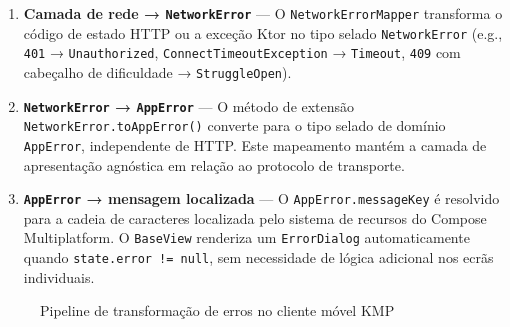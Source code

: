 \begin{enumerate}
  \item \textbf{Camada de rede → \texttt{NetworkError}} —
    O \texttt{NetworkErrorMapper} transforma o código de estado HTTP ou a
    exceção Ktor no tipo selado \texttt{NetworkError}
    (e.g., \texttt{401} → \texttt{Unauthorized},
    \texttt{ConnectTimeoutException} → \texttt{Timeout},
    \texttt{409} com cabeçalho de dificuldade → \texttt{StruggleOpen}).

  \item \textbf{\texttt{NetworkError} → \texttt{AppError}} —
    O método de extensão \texttt{NetworkError.toAppError()} converte para
    o tipo selado de domínio \texttt{AppError}, independente de HTTP.
    Este mapeamento mantém a camada de apresentação agnóstica em relação ao
    protocolo de transporte.

  \item \textbf{\texttt{AppError} → mensagem localizada} —
    O \texttt{AppError.messageKey} é resolvido para a cadeia de
    caracteres localizada pelo sistema de recursos do Compose Multiplatform.
    O \texttt{BaseView} renderiza um \texttt{ErrorDialog} automaticamente
    quando \texttt{state.error != null}, sem necessidade de lógica
    adicional nos ecrãs individuais.
\end{enumerate}

\begin{figure}[htbp]
  \centering
  \caption{Pipeline de transformação de erros no cliente móvel KMP}
  \label{fig:mobile_erros}
\end{figure}

